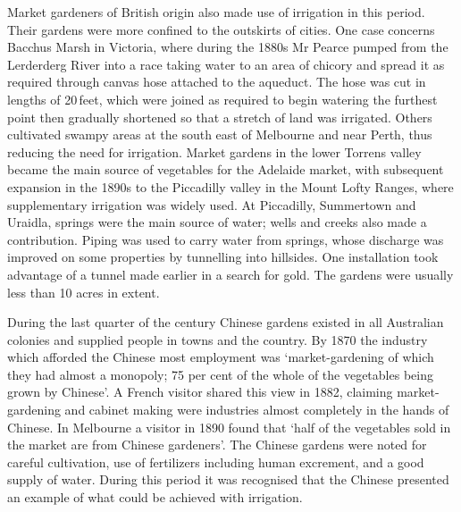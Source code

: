 Market gardeners of British origin also made use of irrigation in this
period.  Their gardens were more confined to the outskirts of cities.
One case concerns Bacchus Marsh  in
Victoria,  where during the 1880s Mr Pearce pumped
from the Lerderderg River  into a race taking
water to an area of chicory and spread it as required through canvas
hose attached to the aqueduct.
The hose was cut in lengths of 20\,feet, which were joined as required
to begin watering the furthest point then gradually shortened so that
a stretch of land was irrigated.  Others cultivated swampy areas at
the south east of Melbourne  and near Perth,
 thus reducing the need for irrigation.  Market
gardens in the lower Torrens valley  became the
main source of vegetables for the Adelaide market,  with subsequent expansion in the 1890s to the Piccadilly valley
 in the Mount Lofty Ranges,  where supplementary irrigation was widely used.  At
Piccadilly,  Summertown 
and Uraidla,  springs were the main source of
water; wells and creeks also made a contribution.  Piping was used to
carry water from springs, whose discharge was improved on some
properties by tunnelling into hillsides.  One installation took
advantage of a tunnel made earlier
in a search for gold.  The gardens were usually less than 10 acres in
extent.

During the last quarter of the century Chinese gardens existed in all
Australian colonies and supplied people in towns and the country.  By
1870 the industry which afforded the Chinese most employment was
`market-gardening of which they had almost a monopoly; 75 per cent of
the whole of the vegetables being grown by Chinese'.  A French visitor
shared this view in 1882, claiming market-gardening and cabinet making
were industries almost completely in the hands of Chinese.  In
Melbourne a visitor in 1890 found that `half of the vegetables sold in
the market are from Chinese gardeners'. The Chinese gardens were noted
for careful cultivation, use of fertilizers including human
excrement, and a good supply of water.  During
this period it was recognised that the Chinese presented an example of
what could be achieved with irrigation.

